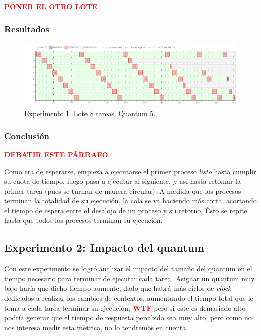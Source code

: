 \documentclass[a4paper]{article}
\begin{document}
\textbf{\textcolor{red}{PONER EL OTRO LOTE}}

\subsubsection{Resultados}
\begin{figure}[htb]
\begin{center}
\includegraphics[scale=0.4]{imagenes/ej4-1.png}
\end{center}
\caption{Experimento 1. Lote 8 tareas. Quantum 5.}
\end{figure}

\subsubsection{Conclusión}

\textcolor{red}{\textbf{DEBATIR ESTE PÁRRAFO}}

Como era de esperarse, empieza a ejecutarse el primer proceso \textit{listo}
hasta cumplir su cuota de tiempo, luego pasa a ejecutar al siguiente, y así
hasta retomar la primer tarea (pues se turnan de manera circular). A medida
que los procesos terminan la totalidad de su ejecución, la cola se va
haciendo más corta, acortando el tiempo de espera entre el desalojo de un
proceso y su retorno. Ésto se repite hasta que todos los procesos terminan
su ejecución.

\subsection{Experimento 2: Impacto del quantum}
Con este experimento se logró analizar el impacto del tamaño del quantum en
el tiempo necesario para terminar de ejecutar cada tarea. Asignar un quantum
muy bajo haría que dicho tiempo aumente, dado que habrá más ciclos de
\textit{clock} dedicados a realizar los cambios de contextos, aumentando el
tiempo total que le toma a cada tarea terminar su ejecución,
\textcolor{red}{\textbf{WTF}} pero si este es demasiado alto podría generar
que el tiempo de respuesta percibido sea muy alto, pero como no nos interesa
medir esta métrica, no lo tendremos en cuenta.
\end{document}
